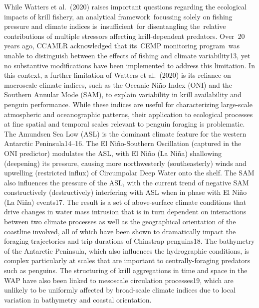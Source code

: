 \documentclass[]{elsarticle} %
\begin{document}
While Watters et al.~(2020) raises important questions regarding the
ecological impacts of krill fishery, an analytical framework~focussing
solely on fishing pressure and climate indices is~insufficient~for
disentangling the~relative contributions of multiple stressors affecting
krill-dependent predators. Over~20 years ago, CCAMLR acknowledged that
its~CEMP monitoring program~was unable to distinguish between the
effects of fishing and climate variability13, yet no substantive
modifications have been implemented to address this limitation. In this
context, a further limitation of Watters et al.~(2020) is its reliance
on macroscale climate indices, such as the Oceanic Niño Index (ONI) and
the Southern Annular Mode (SAM), to explain variability in krill
availability and penguin performance. While these indices are useful for
characterizing large-scale atmospheric and oceanographic patterns, their
application to ecological processes at fine spatial and temporal scales
relevant to penguin foraging is problematic. The Amundsen Sea Low (ASL)
is the dominant climate feature for the western Antarctic
Peninsula14--16. The El Niño-Southern Oscillation (captured in the ONI
predictor) modulates the ASL, with El Niño (La Niña) shallowing
(deepening) its pressure, causing more northwesterly (southeasterly)
winds and upwelling (restricted influx) of Circumpolar Deep Water onto
the shelf. The SAM also influences the pressure of the ASL, with the
current trend of negative SAM constructively (destructively) interfering
with ASL when in phase with El Niño (La Niña) events17. The result is a
set of above-surface climate conditions that drive changes in water mass
intrusion that is in turn dependent on interactions between two climate
processes as well as the geographical orientation of the coastline
involved, all of which have been shown to dramatically impact the
foraging trajectories and trip durations of Chinstrap penguins18. The
bathymetry of the Antarctic Peninsula, which also influences the
hydrographic conditions, is complex particularly at scales that are
important to centrally-foraging predators such as penguins. The
structuring of krill aggregations in time and space in the WAP have also
been linked to mesoscale circulation processes19, which are unlikely to
be uniformly affected by broad-scale climate indices due to local
variation in bathymetry and coastal orientation.
\end{document}
